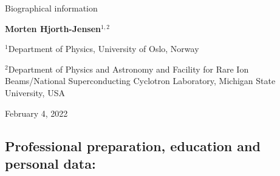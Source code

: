 \documentclass[%
oneside,                 %
final,                   %
10pt]{article}
\begin{document}

\newcommand{\exercisesection}[1]{\subsection*{#1}}






\thispagestyle{empty}

\begin{center}
{\LARGE\bf
\begin{spacing}{1.25}
Biographical  information
\end{spacing}
}
\end{center}


\begin{center}
{\bf Morten Hjorth-Jensen${}^{1, 2}$} \\ [0mm]
\end{center}

\begin{center}
\centerline{{\small ${}^1$Department of Physics, University of Oslo, Norway}}
\centerline{{\small ${}^2$Department of Physics and Astronomy and Facility for Rare Ion Beams/National Superconducting Cyclotron Laboratory, Michigan State University, USA}}
\end{center}
    

\begin{center}
February 4, 2022
\end{center}

\vspace{1cm}


\subsection{Professional preparation, education  and personal data:}
\end{document}
